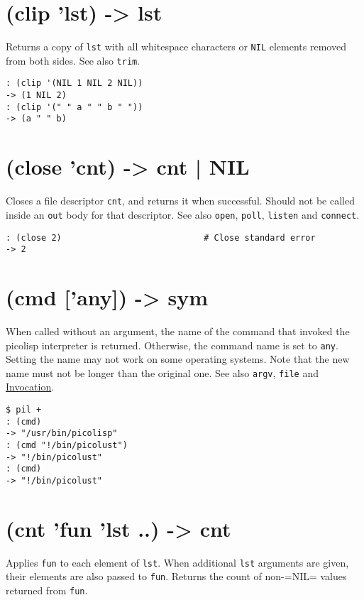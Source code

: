 { 
\section{(clip 'lst) -> lst}
\label{sec-8-1-3-23}


Returns a copy of \texttt{lst} with all whitespace characters or \texttt{NIL} elements
removed from both sides. See also \texttt{trim}.


\begin{verbatim}
: (clip '(NIL 1 NIL 2 NIL))
-> (1 NIL 2)
: (clip '(" " a " " b " "))
-> (a " " b)
\end{verbatim}

 
\section{(close 'cnt) -> cnt | NIL}
\label{sec-8-1-3-24}


Closes a file descriptor \texttt{cnt}, and returns it when successful. Should
not be called inside an \texttt{out} body for that descriptor. See also \texttt{open},
\texttt{poll}, \texttt{listen} and \texttt{connect}.


\begin{verbatim}
: (close 2)                            # Close standard error
-> 2
\end{verbatim}

 
\section{(cmd ['any]) -> sym}
\label{sec-8-1-3-25}


When called without an argument, the name of the command that invoked
the picolisp interpreter is returned. Otherwise, the command name is set
to \texttt{any}. Setting the name may not work on some operating systems. Note
that the new name must not be longer than the original one. See also
\texttt{argv}, \texttt{file} and \hyperref[ref.html-invoc]{Invocation}.


\begin{verbatim}
$ pil +
: (cmd)
-> "/usr/bin/picolisp"
: (cmd "!/bin/picolust")
-> "!/bin/picolust"
: (cmd)
-> "!/bin/picolust"
\end{verbatim}

 
\section{(cnt 'fun 'lst ..) -> cnt}
\label{sec-8-1-3-26}


Applies \texttt{fun} to each element of \texttt{lst}. When additional \texttt{lst} arguments
are given, their elements are also passed to \texttt{fun}. Returns the count of
non-=NIL= values returned from \texttt{fun}.


}
